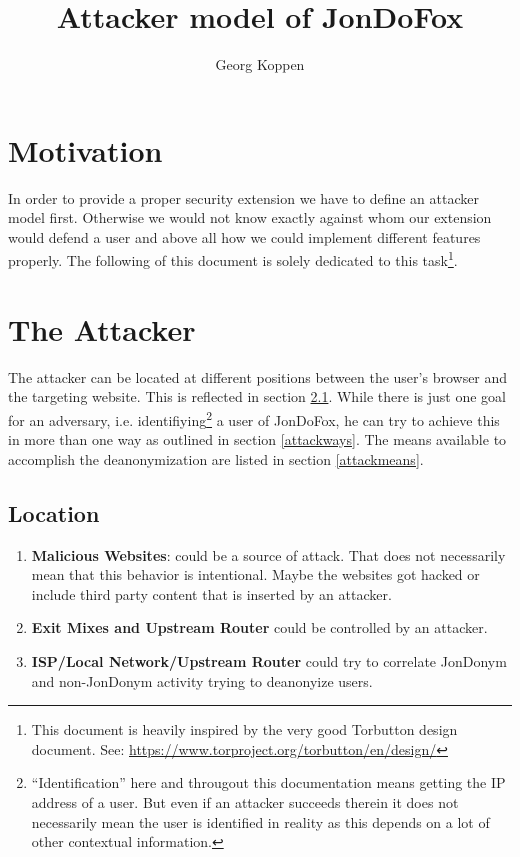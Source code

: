 \documentclass[a4paper,10pt]{scrartcl}
\title{Attacker model of JonDoFox}
\author{Georg Koppen}
\begin{document}
  \maketitle
  \section{Motivation}
    In order to provide a proper security extension we have to define an 
    attacker model first. Otherwise we would not know exactly against whom our
    extension would defend a user and above all how we could implement 
    different features properly. The following of this document is solely 
    dedicated to this task\footnote{This document is heavily inspired by the
    very good Torbutton design document. See: 
    \url{https://www.torproject.org/torbutton/en/design/}}.
  \section{The Attacker}
    The attacker can be located at different positions between the user's 
    browser and the targeting website. This is reflected in section 
    \ref{attacklocation}. While there is just one goal for an adversary, i.e.
    identifiying\footnote{``Identification'' here and 
    througout this documentation means getting the IP address of a user. But 
    even if an attacker succeeds therein it does not necessarily mean the user 
    is identified in reality as this depends on a lot of other contextual 
    information.} a user of JonDoFox, he can try to achieve this in more than one
    way as outlined in section \ref{attackways}. The means available to 
    accomplish the deanonymization are listed in section \ref{attackmeans}.
    \subsection{Location}\label{attacklocation}
      \begin{enumerate}
        \item \textbf{Malicious Websites}: could be a source of attack. That does 
          not necessarily mean that this behavior is intentional. Maybe the 
          websites got hacked or include third party content that is inserted by
	  an attacker.
        \item \textbf{Exit Mixes and Upstream Router} could be controlled by an
          attacker.
        \item \textbf{ISP/Local Network/Upstream Router} could try to correlate
	  JonDonym and non-JonDonym activity trying to deanonyize users.
      \end{enumerate}
\end{document}
